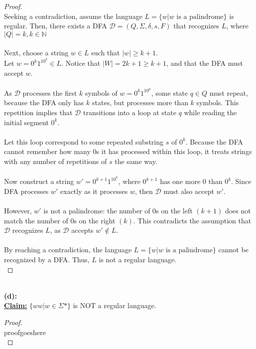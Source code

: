\documentclass[12pt]{article}
\begin{document}
\begin{proof}
\leavevmode\\
    Seeking a contradiction, assume the language $L = \{ w | w \text{ is a palindrome} \}$ is regular. Then, there exists a DFA $\mathcal{D} = (Q, \Sigma, \delta, s, F)$ that recognizes $L$, where $|Q| = k, k \in \mathbb{N}$ \\
    \\
    Next, choose a string $w \in L$ such that $|w| \geq k + 1$. \\
    Let $w = 0^k1^10^k \in L$. Notice that $|W| = 2k + 1 \geq k + 1$, and that the DFA must accept $w$. \\
    \\
    As $\mathcal{D}$ processes the first $k$ symbols of $w = 0^k1^10^k$, some state $q \in Q$ must repeat, because the DFA only has $k$ states, but processes more than $k$ symbols. This repetition implies that $\mathcal{D}$ transitions into a loop at state $q$ while reading the initial segment $0^k$. \\
    \\
    Let this loop correspond to some repeated substring $s$ of $0^k$. Because the DFA cannot remember how many $0$s it has processed within this loop, it treats strings with any number of repetitions of $s$ the same way. \\
    \\
    Now construct a string $w' = 0^{k + 1}1^10^k$, where $0^{k + 1}$ has one more $0$ than $0^k$. Since DFA processes $w'$ exactly as it processes $w$, then $\mathcal{D}$ must also accept $w'$. \\
    \\
    However, $w'$ is not a palindrome: the number of $0$s on the left $(k + 1)$ does not match the number of $0$s on the right $(k)$. This contradicts the assumption that $\mathcal{D}$ recognizes $L$, as $\mathcal{D}$ accepts $w' \notin L$. \\
    \\
    By reaching a contradiction, the language $L = \{ w | w \text{ is a palindrome} \}$ cannot be recognized by a DFA. Thus, $L$ is not a regular language. \\
\end{proof}
\leavevmode\\
\textbf{(d):} \\
\textbf{\underline{Claim:}} $\{ ww | w \in \Sigma* \}$ is NOT a regular language.
\begin{proof}
\leavevmode\\
    proofgoeshere \\
\end{proof}
\end{document}
